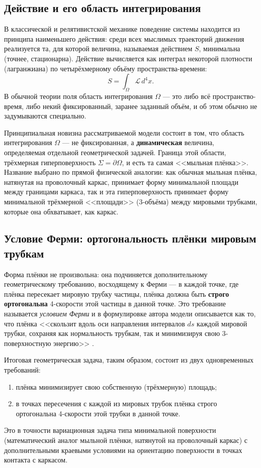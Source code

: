 \documentclass[12pt,a4paper]{article}
\begin{document}
\subsection{Действие и его область интегрирования}

В классической и релятивистской механике поведение системы находится
из принципа наименьшего действия: среди всех мыслимых траекторий
движения реализуется та, для которой величина, называемая действием
$S$, минимальна (точнее, стационарна). Действие вычисляется как
интеграл некоторой плотности (лагранжиана) по четырёхмерному объёму
пространства-времени:
\begin{equation}
S = \int_\Omega \mathcal L\, d^4x.
\end{equation}
В обычной теории поля область интегрирования $\Omega$ --- это либо
всё пространство-время, либо некий фиксированный, заранее заданный
объём, и об этом обычно не задумываются специально.

Принципиальная новизна рассматриваемой модели состоит в том, что
область интегрирования $\Omega$ --- не фиксированная, а
\textbf{динамическая} величина, определяемая отдельной геометрической
задачей. Граница этой области, трёхмерная гиперповерхность
$\Sigma=\partial\Omega$, и есть та самая <<мыльная плёнка>>. Название
выбрано по прямой физической аналогии: как обычная мыльная плёнка,
натянутая на проволочный каркас, принимает форму минимальной площади
между границами каркаса, так и эта гиперповерхность принимает форму
минимальной трёхмерной <<площади>> (3-объёма) между мировыми
трубками, которые она обхватывает, как каркас.

\subsection{Условие Ферми: ортогональность плёнки мировым трубкам}

Форма плёнки не произвольна: она подчиняется дополнительному
геометрическому требованию, восходящему к Ферми \cite{Fermi1923} ---
в каждой точке, где плёнка пересекает мировую трубку частицы, плёнка
должна быть \textbf{строго ортогональна} 4-скорости этой частицы в
данной точке. Это требование называется \emph{условием Ферми} и в
формулировке автора модели описывается как то, что плёнка <<скользит
вдоль оси направления интервалов $ds$ каждой мировой трубки, сохраняя
как нормальность трубкам, так и минимизируя свою 3-поверхностную
энергию>> \cite{coax}.

Итоговая геометрическая задача, таким образом, состоит из двух
одновременных требований:
\begin{enumerate}
\item плёнка минимизирует свою собственную (трёхмерную) площадь;
\item в точках пересечения с каждой из мировых трубок плёнка строго
ортогональна 4-скорости этой трубки в данной точке.
\end{enumerate}
Это в точности вариационная задача типа минимальной поверхности
(математический аналог мыльной плёнки, натянутой на проволочный
каркас) с дополнительными краевыми условиями на ориентацию поверхности
в точках контакта с каркасом.
\end{document}
